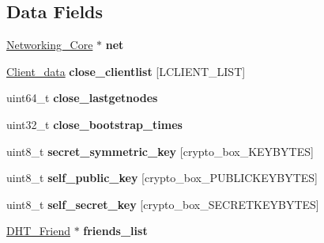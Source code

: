 \subsection*{Data Fields}
\begin{DoxyCompactItemize}
\item 
\hypertarget{struct_d_h_t_aa14ea2f67950f57fe4235d7375a2216c}{\hyperlink{struct_networking___core}{Networking\+\_\+\+Core} $\ast$ {\bfseries net}}\label{struct_d_h_t_aa14ea2f67950f57fe4235d7375a2216c}

\item 
\hypertarget{struct_d_h_t_a00ef35d5b0e7a791ef08a30b3bacbf9d}{\hyperlink{struct_client__data}{Client\+\_\+data} {\bfseries close\+\_\+clientlist} \mbox{[}L\+C\+L\+I\+E\+N\+T\+\_\+\+L\+I\+S\+T\mbox{]}}\label{struct_d_h_t_a00ef35d5b0e7a791ef08a30b3bacbf9d}

\item 
\hypertarget{struct_d_h_t_a3ab563f182d86c5bc6322ee416a10a32}{uint64\+\_\+t {\bfseries close\+\_\+lastgetnodes}}\label{struct_d_h_t_a3ab563f182d86c5bc6322ee416a10a32}

\item 
\hypertarget{struct_d_h_t_afacccecf0d2090a9dec8d06f3f119087}{uint32\+\_\+t {\bfseries close\+\_\+bootstrap\+\_\+times}}\label{struct_d_h_t_afacccecf0d2090a9dec8d06f3f119087}

\item 
\hypertarget{struct_d_h_t_ab9f2ff47bc0b1e5110202a6e4be86390}{uint8\+\_\+t {\bfseries secret\+\_\+symmetric\+\_\+key} \mbox{[}crypto\+\_\+box\+\_\+\+K\+E\+Y\+B\+Y\+T\+E\+S\mbox{]}}\label{struct_d_h_t_ab9f2ff47bc0b1e5110202a6e4be86390}

\item 
\hypertarget{struct_d_h_t_ae726df8bdc26380e5a6c3187a00d6881}{uint8\+\_\+t {\bfseries self\+\_\+public\+\_\+key} \mbox{[}crypto\+\_\+box\+\_\+\+P\+U\+B\+L\+I\+C\+K\+E\+Y\+B\+Y\+T\+E\+S\mbox{]}}\label{struct_d_h_t_ae726df8bdc26380e5a6c3187a00d6881}

\item 
\hypertarget{struct_d_h_t_aa05050f86513ff53fe9da81f73c72267}{uint8\+\_\+t {\bfseries self\+\_\+secret\+\_\+key} \mbox{[}crypto\+\_\+box\+\_\+\+S\+E\+C\+R\+E\+T\+K\+E\+Y\+B\+Y\+T\+E\+S\mbox{]}}\label{struct_d_h_t_aa05050f86513ff53fe9da81f73c72267}

\item 
\hypertarget{struct_d_h_t_ae97c6b057d770e7c4f3905cbe33b188b}{\hyperlink{struct_d_h_t___friend}{D\+H\+T\+\_\+\+Friend} $\ast$ {\bfseries friends\+\_\+list}}\label{struct_d_h_t_ae97c6b057d770e7c4f3905cbe33b188b}


\end{DoxyCompactItemize}
